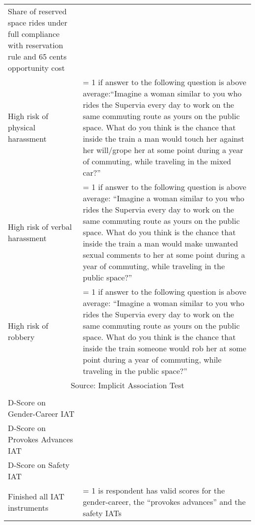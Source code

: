 \begin{table}[H]
\begin{tabular}{p{.4\linewidth}p{.6\linewidth}}
Share of reserved space rides under full compliance with reservation rule and 65 cents opportunity cost		&		\\
High risk of physical harassment &	= 1 if answer to the following question is above average:``Imagine a woman similar to you who rides the Supervia every day to work on the same commuting route as yours on the public space. What do you think is the chance that inside the train a man would touch her against her will/grope her at some point during a year of commuting, while traveling in the mixed car?''	\\
High risk of verbal harassment  &	= 1 if answer to the following question is above average: ``Imagine a woman similar to you who rides the Supervia every day to work on the same commuting route as yours on the public space. What do you think is the chance that inside the train a man would make unwanted sexual comments to her at some point during a year of commuting, while traveling in the public space?''	\\
High risk of robbery 	&	 = 1 if answer to the following question is above average: ``Imagine a woman similar to you who rides the Supervia every day to work on the same commuting route as yours on the public space. What do you think is the chance that inside the train someone would rob her at some point during a year of commuting, while traveling in the public space?'' \\
\hline 
 \multicolumn{2}{c}{Source: Implicit Association Test} \\
    \hline\\[-1.8ex]
D-Score on Gender-Career IAT &		\\
D-Score on Provokes Advances IAT &		\\
D-Score on Safety IAT &		\\
Finished all IAT instruments &	= 1 is respondent has valid scores for the gender-career, the ``provokes advances'' and the safety IATs \\
\hline\hline
    \end{tabular}
\end{table}

